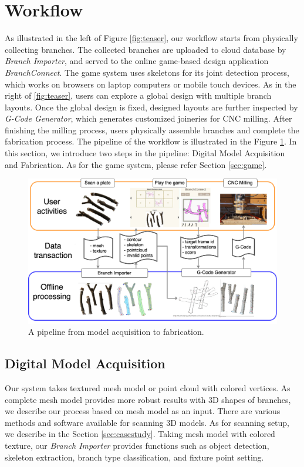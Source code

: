 \section{Workflow}
As illustrated in the left of Figure \ref{fig:teaser}, our workflow starts from physically collecting branches.
The collected branches are uploaded to cloud database by \textit{Branch Importer}, and served to the online game-based design application \textit{BranchConnect}.
The game system uses skeletons for its joint detection process, which works on browsers on laptop computers or mobile touch devices.
As in the right of \ref{fig:teaser}, users can explore a global design with multiple branch layouts.
Once the global design is fixed, designed layouts are further inspected by \textit{G-Code Generator}, which generates customized joineries for CNC milling.
After finishing the milling process, users physically assemble branches and complete the fabrication process.
The pipeline of the workflow is illustrated in the Figure \ref{fig:pipeline}.
In this section, we introduce two steps in the pipeline: Digital Model Acquisition and Fabrication.
As for the game system, please refer Section \ref{sec:game}.

\begin{figure}[ht]
  \begin{center}
    \includegraphics[width = 0.4\paperwidth]{images/workflow/pipeline.png}
    \caption{A pipeline from model acquisition to fabrication.}
    \label{fig:pipeline}
  \end{center}
\end{figure}

\subsection{Digital Model Acquisition}
Our system takes textured mesh model or point cloud with colored vertices.
As complete mesh model provides more robust results with 3D shapes of branches, we describe our process based on mesh model as an input.
There are various methods and software available for scanning 3D models.
As for scanning setup, we describe in the Section \ref{sec:casestudy}.
Taking mesh model with colored texture, our \textit{Branch Importer} provides functions such as object detection, skeleton extraction, branch type classification, and fixture point setting.

